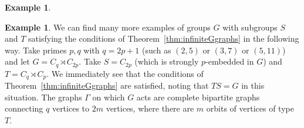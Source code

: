 \documentclass[12pt]{amsart}
\theoremstyle{plain}
\theoremstyle{definition}
\newtheorem{example}[theorem]{Example}
\theoremstyle{remark}
\numberwithin{equation}{section}
\newcommand{\Orbit}[2]{\mathcal{O}^{#1}_{#2}}
\newcommand{\AOfive}{A_{5}\backslash\Gamma}
\begin{document}
\begin{example}
    

\end{example}
\begin{example}
We can find many more examples of groups $G$ with subgroups $S$ and $T$ satisfying the conditions of Theorem~\ref{thm:infiniteGgraphs} in the following way. Take primes $p,q$ with $q=2p+1$ (such as $(2,5)$ or $(3,7)$ or $(5,11)$) and let $G=C_q\rtimes C_{2p}$. Take $S=C_{2p}$ (which is strongly $p$-embedded in $G$) and $T=C_q\rtimes C_p$. We immediately see that the conditions of Theorem~\ref{thm:infiniteGgraphs} are satisfied, noting that $TS=G$ in this situation. The graphs $\Gamma$ on which $G$ acts are complete bipartite graphs connecting $q$ vertices to $2m$ vertices, where there are $m$ orbits of vertices of type $T$.
\end{example}
\end{document}
